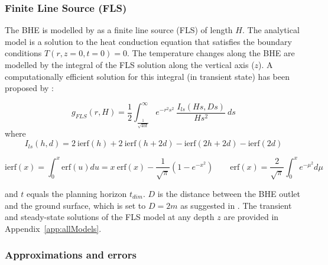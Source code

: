 \subsubsection{Finite Line Source (FLS)}
The BHE is modelled by \citet{claesson_conductive_1988} as a finite line source (FLS) of length $H$. The analytical model is
a solution to the heat conduction equation that satisfies the boundary conditions $T(r, z=0, t=0) = 0$. 
The temperature changes along the BHE are modelled by the integral of the FLS solution along the vertical axis ($z$).
A computationally efficient solution for this integral (in transient state) has been proposed by \citet{claesson_analytical_2011}:

\begin{equation}
\label{eq:FLS_int}
     g_{FLS}(r, H) = \frac{1}{2} \int_{\frac{1}{\sqrt{4 \alpha t}}}^{\infty}  e^{- r^2 s^2} \ \frac{I_{ls}(Hs, Ds)}{H s^2} \ ds
\end{equation}
where
\begin{equation*}
    I_{ls}(h, d) = 2\ \mathrm{ierf}(h) + 2\ \mathrm{ierf}(h + 2d) - \mathrm{ierf}(2h + 2d) - \mathrm{ierf}(2d)
\end{equation*}

\begin{equation*}
    \mathrm{ierf}(x) = \int_0^x \mathrm{erf}(u) du 
                     = x \ \mathrm{erf}(x) - \frac{1}{\sqrt{\pi}} (1 - e^{-x^2})
    \qquad
    \mathrm{erf}(x) = \frac{2}{\sqrt{\pi}} \int_0^x e^{-\mu^2} d \mu 
\end{equation*}

and $t$ equals the planning horizon $t_\mathit{dim}$. $D$ is the distance between the BHE outlet and the ground surface, which is set to $D = 2m$ as suggested in \cite{pahud_geothermal_2002}. The transient and steady-state solutions of the FLS model at any depth $z$ are provided in Appendix~\ref{app:allModels}.

\subsubsection{Approximations and errors}

